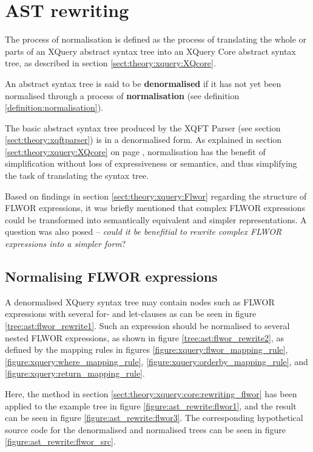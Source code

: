 \section{AST rewriting}
\label{sect:method:ast_rewrite}
\begin{myDefinition}
\label{definition:normalisation}
The process of normalisation is defined as the process of translating the
whole or parts of an XQuery abstract syntax tree into an XQuery Core abstract
syntax tree, as described in section \ref{sect:theory:xquery:XQcore}.
\end{myDefinition}

\begin{myDefinition}
\label{definition:denormalised}
An abstract syntax tree is said to be \textbf{denormalised} if it has not yet
been normalised through a process of \textbf{normalisation} (see definition
\ref{definition:normalisation}).
\end{myDefinition}

The basic abstract syntax tree produced by the XQFT Parser (see section
\ref{sect:theory:xqftparser}) is in a denormalised form. As explained in
section \ref{sect:theory:xquery:XQcore} on page
\pageref{sect:theory:xquery:XQcore}, normalisation has the benefit of
simplification without loss of expressiveness or semantics, and thus
simplifying the task of translating the syntax tree.

Based on findings in section \ref{sect:theory:xquery:Flwor} regarding the
structure of FLWOR expressions, it was briefly mentioned that complex FLWOR
expressions could be transformed into semantically equivalent and simpler
representations. A question was also posed --\emph{ could it be
benefitial to rewrite complex FLWOR expressions into a simpler form}?

\subsection{Normalising FLWOR expressions}
A denormalised XQuery syntax tree may contain nodes such as FLWOR expressions
 with several for- and let-clauses as can be seen in figure \ref{tree:ast:flwor_rewrite1}. Such an
expression should be normalised to several nested FLWOR expressions, as shown
in figure \ref{tree:ast:flwor_rewrite2}, as defined by the mapping rules in
figures \ref{figure:xquery:flwor_mapping_rule},
\ref{figure:xquery:where_mapping_rule},
\ref{figure:xquery:orderby_mapping_rule}, and
\ref{figure:xquery:return_mapping_rule}.

Here, the method in section \ref{sect:theory:xquery:core:rewriting_flwor} has
been applied to the example tree in figure \ref{figure:ast_rewrite:flwor1},
and the result can be seen in figure \ref{figure:ast_rewrite:flwor3}. The
corresponding hypothetical source code for the denormalised and normalised trees
can be seen in figure \ref{figure:ast_rewrite:flwor_src}.

